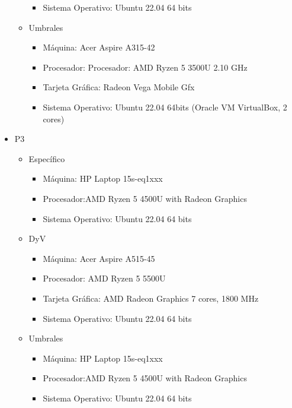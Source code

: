 \documentclass{article}
\begin{document}
\begin{itemize}
\begin{itemize}
\begin{itemize}
                \item Sistema Operativo: Ubuntu 22.04 64 bits
            \end{itemize}
            \item Umbrales\begin{itemize}
                \item Máquina: Acer Aspire A315-42
                \item Procesador: Procesador: AMD Ryzen 5 3500U 2.10 GHz
                \item Tarjeta Gráfica: Radeon Vega Mobile Gfx
                \item Sistema Operativo: Ubuntu 22.04 64bits (Oracle VM VirtualBox, 2 cores)
            \end{itemize}
        \end{itemize}
        \item P3
        \begin{itemize}
            \item Específico\begin{itemize}
                \item Máquina: HP Laptop 15s-eq1xxx
                \item Procesador:AMD Ryzen 5 4500U with Radeon Graphics
                \item Sistema Operativo: Ubuntu 22.04 64 bits
            \end{itemize}
            \item DyV\begin{itemize}
                \item Máquina: Acer Aspire A515-45
                \item Procesador: AMD Ryzen 5 5500U 
                \item Tarjeta Gráfica: AMD Radeon Graphics 7 cores, 1800 MHz


                \item Sistema Operativo: Ubuntu 22.04 64 bits
            \end{itemize}
                \item Umbrales\begin{itemize}
                \item Máquina: HP Laptop 15s-eq1xxx
                \item Procesador:AMD Ryzen 5 4500U with Radeon Graphics
                \item Sistema Operativo: Ubuntu 22.04 64 bits
            \end{itemize}
        \end{itemize}
    \end{itemize}
        
\end{document}
